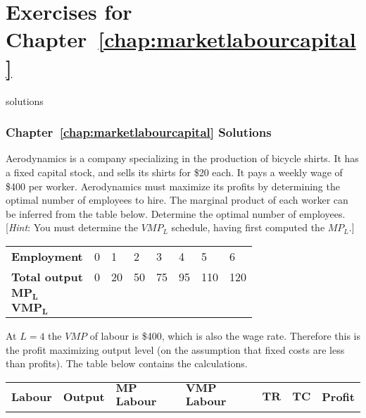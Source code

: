 \newpage
\section*{Exercises for Chapter~\ref{chap:marketlabourcapital}}

\begin{Filesave}{solutions}
\subsubsection*{Chapter~\ref{chap:marketlabourcapital} Solutions}
\end{Filesave}

\begin{enumialphparenastyle}

\begin{econex}\label{ex:ch12ex1}
Aerodynamics is a company specializing in the production of bicycle shirts. It has a fixed capital stock, and sells its shirts for \$20 each. It pays a weekly wage of \$400 per worker. Aerodynamics must maximize its profits by determining the optimal number of employees to hire. The marginal product of each worker can be inferred from the table below. Determine the optimal number of employees. [\textit{Hint}: You must determine the $VMP_L$ schedule, having first computed the $MP_L$.]
\begin{Table}{}
\begin{tabu} to \linewidth {|X[3,c]X[1,c]X[1,c]X[1,c]X[1,c]X[1,c]X[1,c]X[1,c]|}	\hline
{}	\textbf{Employment}		&	0	&	1	&	2	&	3	&	4	&	5	&	6	\\
\textbf{Total output}	&	0	&	20	&	50	&	75	&	95	&	110	&	120	\\
	\textbf{$\mathbf{MP_L}$}			&		&		&		&		&		&		&		\\
\textbf{$\mathbf{VMP_L}$}		&		&		&		&		&		&		&		\\	\hline
\end{tabu}
\end{Table}
\begin{econsolution}
At $L=4$ the $VMP$ of labour is \$400, which is also the wage rate. Therefore this is the profit maximizing output level (on the assumption that fixed costs are less than profits). The table below contains the calculations.
\begin{Table}{}\small
\begin{tabu} to \linewidth {|X[0.7,c]X[0.7,c]X[1,c]X[1,c]X[0.7,c]X[0.7,c]X[0.7,c]|}	\hline
{}\textbf{Labour} & \textbf{Output} & \textbf{$\mathbf{MP}$ Labour} & \textbf{$\mathbf{VMP}$ Labour} & \textbf{$\mathbf{TR}$} & \textbf{$\mathbf{TC}$} & \textbf{Profit}	\\

\end{tabu}
\end{Table}
\end{econsolution}
\end{econex}
\end{enumialphparenastyle}
